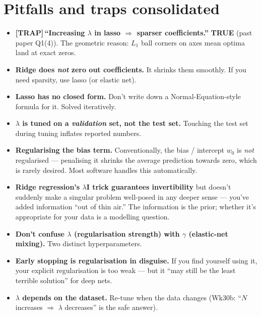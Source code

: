 \documentclass[11pt, a4paper]{article}
\newcommand{\trapflag}{\textcolor{trapBd}{\textbf{[TRAP]}}\,}
\begin{document}
\section*{Pitfalls and traps consolidated}

\begin{itemize}
  \item \trapflag{}\textbf{``Increasing $\lambda$ in lasso $\Rightarrow$ sparser coefficients.''} \textbf{TRUE} (past paper Q1(4)). The geometric reason: $L_1$ ball corners on axes mean optima land at exact zeros.
  \item \textbf{Ridge does \emph{not} zero out coefficients.} It shrinks them smoothly. If you need sparsity, use lasso (or elastic net).
  \item \textbf{Lasso has no closed form.} Don't write down a Normal-Equation-style formula for it. Solved iteratively.
  \item \textbf{$\lambda$ is tuned on a \emph{validation} set, not the test set.} Touching the test set during tuning inflates reported numbers.
  \item \textbf{Regularising the bias term.} Conventionally, the bias / intercept $w_0$ is \emph{not} regularised — penalising it shrinks the average prediction towards zero, which is rarely desired. Most software handles this automatically.
  \item \textbf{Ridge regression's $\lambda\mathbf{I}$ trick guarantees invertibility} but doesn't suddenly make a singular problem well-posed in any deeper sense — you've added information ``out of thin air.'' The information is the prior; whether it's appropriate for your data is a modelling question.
  \item \textbf{Don't confuse $\lambda$ (regularisation strength) with $\gamma$ (elastic-net mixing).} Two distinct hyperparameters.
  \item \textbf{Early stopping is regularisation in disguise.} If you find yourself using it, your explicit regularisation is too weak — but it ``may still be the least terrible solution'' for deep nets.
  \item \textbf{$\lambda$ depends on the dataset.} Re-tune when the data changes (Wk30b: ``$N$ increases $\Rightarrow$ $\lambda$ decreases'' is the safe answer).
\end{itemize}

\end{document}
